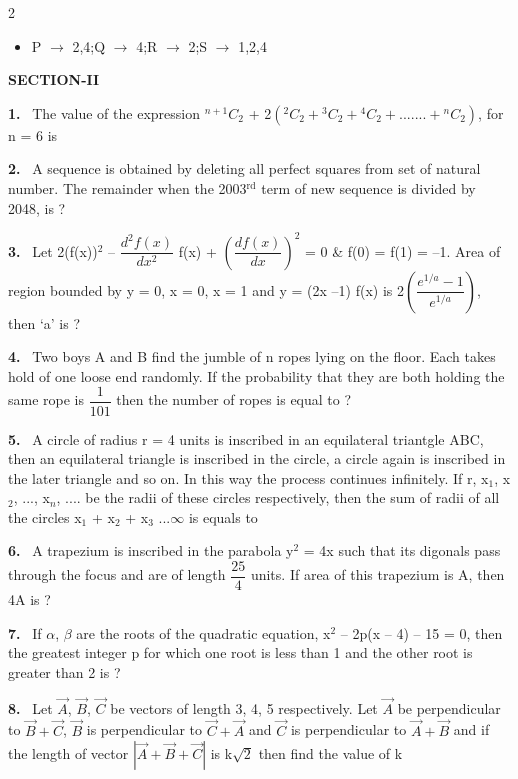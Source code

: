 \documentclass[10pt]{extarticle}
\newcommand{\sect}[1]{\par\smallskip\noindent\textbf{#1}\par}
\newcommand{\qn}[1]{\par\smallskip\noindent\textbf{#1.}~}
\newenvironment{qoptions}{\begin{itemize}[leftmargin=1.8em,itemsep=1pt,topsep=2pt,label={}]}{\end{itemize}}
\newcommand{\opt}[2]{\item[(#1)] #2}
\begin{document}
\begin{multicols}{2}
\begin{qoptions}
\opt{D}{P $\rightarrow$ 2,4;Q $\rightarrow$ 4;R $\rightarrow$ 2;S $\rightarrow$ 1,2,4}
\end{qoptions}
\sect{SECTION-II}
\qn{1} The value of the expression ${}^{n+1}C_2$ + 2$\left({}^2C_2+{}^3C_2+{}^4C_2+.......+{}^nC_2\right)$, for n = 6 is
\qn{2} A sequence is obtained by deleting all perfect squares from set of natural number. The remainder when the 2003$^{\text{rd}}$ term of new sequence is divided by 2048, is ?
\qn{3} Let 2(f(x))$^2$ -- $\dfrac{d^2f(x)}{dx^2}$ f(x) + $\left(\dfrac{df(x)}{dx}\right)^2$ = 0 \& f(0) = f(1) = --1. Area of region bounded by y = 0, x = 0, x = 1 and y = (2x --1) f(x) is 2$\left(\dfrac{e^{1/a}-1}{e^{1/a}}\right)$, then `a' is ?
\qn{4} Two boys A and B find the jumble of n ropes lying on the floor. Each takes hold of one loose end randomly. If the probability that they are both holding the same rope is $\dfrac{1}{101}$ then the number of ropes is equal to ?
\qn{5} A circle of radius r = 4 units is inscribed in an equilateral triantgle ABC, then an equilateral triangle is inscribed in the circle, a circle again is inscribed in the later triangle and so on. In this way the process continues infinitely. If r, x$_1$, x$_2$, ..., x$_n$, .... be the radii of these circles respectively, then the sum of radii of all the circles x$_1$ + x$_2$ + x$_3$ ...$\infty$ is equals to
\qn{6} A trapezium is inscribed in the parabola y$^2$ = 4x such that its digonals pass through the focus and are of length $\dfrac{25}{4}$ units. If area of this trapezium is A, then 4A is ?
\qn{7} If $\alpha$, $\beta$ are the roots of the quadratic equation, x$^2$ -- 2p(x -- 4) -- 15 = 0, then the greatest integer p for which one root is less than 1 and the other root is greater than 2 is ?
\qn{8} Let $\vec{A}$, $\vec{B}$, $\vec{C}$ be vectors of length 3, 4, 5 respectively. Let $\vec{A}$ be perpendicular to $\vec{B}+\vec{C}$, $\vec{B}$ is perpendicular to $\vec{C}+\vec{A}$ and $\vec{C}$ is perpendicular to $\vec{A}+\vec{B}$ and if the length of vector $|\vec{A}+\vec{B}+\vec{C}|$ is k$\sqrt{2}$ then find the value of k
\end{multicols}
\end{document}
